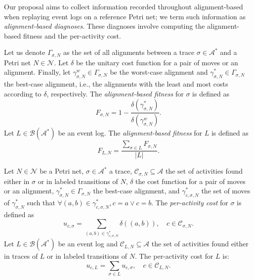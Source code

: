 Our proposal aims to collect information recorded throughout alignment-based  when replaying event logs on a reference Petri net; we term such information as \emph{alignment-based  diagnoses}. These diagnoses involve computing the alignment-based fitness and the per-activity cost.
\begin{definition}
\label{def:ab_fitness}
Let us denote $\Gamma_{\sigma, N}$ as the set of all alignments between a trace $\sigma\in\mathcal{A}^*$ and a Petri net $N\in\mathcal{N}$. Let $\delta$ be the unitary cost function for a pair of moves or an alignment. Finally, let $\gamma^w_{\sigma,N}\in\Gamma_{\sigma, N}$ be the worst-case alignment and $\gamma^*_{\sigma,N}\in\Gamma_{\sigma, N}$ the best-case alignment, i.e., the alignments with the least and most costs according to $\delta$, respectively.  The \emph{alignment-based fitness} for $\sigma$ is defined as
\begin{equation}
F_{\sigma,N}=1-\frac{\delta(\gamma^*_{\sigma,N})}{\delta(\gamma^w_{\sigma,N})}.
\end{equation}
Let $L\in\mathcal{B}(\mathcal{A^*})$ be an event log. The \emph{alignment-based fitness} for $L$ is defined as
\begin{equation}
F_{L,N}=\frac{\sum_{\sigma\in L}F_{\sigma,N}}{|L|}.
\end{equation}
\end{definition}
\begin{definition}
\label{def:act_cost}
Let $N\in\mathcal{N}$ be a Petri net, $\sigma\in\mathcal{A}^*$ a trace, $\mathcal{C}_{\sigma,N}\subseteq\mathcal{A}$ the set of activities found either in $\sigma$ or in labeled transitions of $N$, $\delta$ the cost function for a pair of moves or an alignment, $\gamma^*_{\sigma,N}\in\Gamma_{\sigma, N}$ the best-case alignment, and $\gamma^*_{c,\sigma,N}$ the set of moves of $\gamma^*_{\sigma,N}$ such that $\forall(a,b)\in\gamma^*_{c,\sigma,N}, c=a\lor c=b$. The \emph{per-activity cost} for $\sigma$ is defined as
\begin{equation}
    u_{c,\sigma}=\sum_{(a,b)\in \gamma^*_{c,\sigma,N}}\delta((a,b)),\quad c\in \mathcal{C}_{\sigma,N}.
\end{equation}
Let $L\in\mathcal{B}(\mathcal{A}^*)$ be an event log and $\mathcal{C}_{L,N}\subseteq\mathcal{A}$ the set of activities found either in traces of $L$ or in labeled transitions of $N$. The per-activity cost for $L$ is:
\begin{equation}
    u_{c,L}=\sum_{\sigma\in L}u_{c,\sigma},\quad c\in \mathcal{C}_{L,N}.
\end{equation}
\end{definition}
